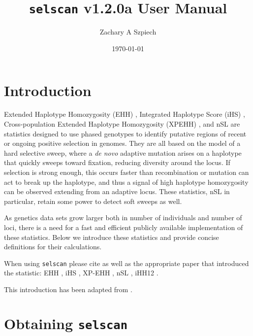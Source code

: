 \documentclass[12pt]{article}%
\title{{\tt selscan} v1.2.0a User Manual}
\date{\today}
\author{Zachary A Szpiech}
\begin{document}
\lstset{breaklines=true,basicstyle=\ttfamily}

\null  %
\nointerlineskip  %
\vfill
\let\snewpage \newpage
\let\newpage \relax
\maketitle
\thispagestyle{empty}
\let \newpage \snewpage
\vfill 
\break %

\tableofcontents 

\newpage

\section{Introduction}

Extended Haplotype Homozygosity (EHH) \cite[]{SabetiEtAl02}, Integrated Haplotype 
Score (iHS) \cite[]{VoightEtAl06}, Cross-population Extended Haplotype 
Homozygosity (XPEHH) \cite[]{SabetiEtAl07}, and nSL \cite[]{FerrerAdmetllaEtAl14} are statistics designed to use phased genotypes to identify putative regions
of recent or ongoing positive selection in genomes.  They are all based on the model of 
a hard selective sweep, where a {\it de novo} adaptive mutation arises on a haplotype
that quickly sweeps toward fixation, reducing diversity around the locus.  If selection is strong enough, this occurs
faster than recombination or mutation can act to break up the haplotype, and thus a signal of high 
haplotype homozygosity can be observed extending from an adaptive locus.  These statistics, nSL in particular, retain some power to detect soft sweeps as well.

As genetics data sets grow larger both in number of individuals and number of loci,
there is a need for a fast and efficient publicly available implementation of these statistics. Below we 
introduce these statistics and provide concise definitions for their calculations.  

When using {\tt selscan} please cite \cite{SzpiechAndHernandez14} as well as the appropriate paper that introduced the statistic: EHH \cite[]{SabetiEtAl02}, iHS \cite[]{VoightEtAl06}, XP-EHH \cite[]{SabetiEtAl07}, nSL \cite[]{FerrerAdmetllaEtAl14}, iHH12 \cite[]{GarudEtAl15, TorresEtAl17}.

This introduction has been adapted from \cite{SzpiechAndHernandez14}.

\section{Obtaining {\tt selscan}}
\end{document}
